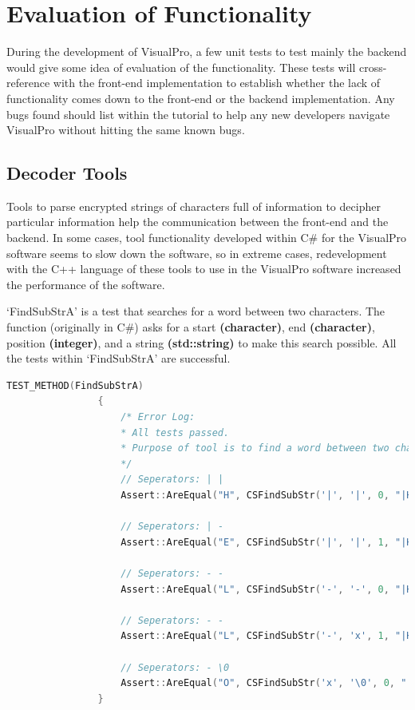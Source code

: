 \documentclass[12pt]{report} %
\begin{document}
	\chapter{Evaluation of Functionality}
		During the development of VisualPro, a few unit tests to test mainly the backend would give some idea of evaluation of the functionality. These tests will cross-reference with the front-end implementation to establish whether the lack of functionality comes down to the front-end or the backend implementation. Any bugs found should list within the tutorial to help any new developers navigate VisualPro without hitting the same known bugs.

		\section{Decoder Tools}
			Tools to parse encrypted strings of characters full of information to decipher particular information help the communication between the front-end and the backend. In some cases, tool functionality developed within C\# for the VisualPro software seems to slow down the software, so in extreme cases, redevelopment with the C++ language of these tools to use in the VisualPro software increased the performance of the software.

			`FindSubStrA' is a test that searches for a word between two characters. The function (originally in C\#) asks for a start \textbf{(character)}, end \textbf{(character)}, position \textbf{(integer)}, and a string \textbf{(std::string)} to make this search possible. All the tests within `FindSubStrA' are successful.

			\begin{lstlisting}[language=c++]
				TEST_METHOD(FindSubStrA)
				{
					/* Error Log:
					* All tests passed.
					* Purpose of tool is to find a word between two characters.
					*/
					// Seperators: | |
					Assert::AreEqual("H", CSFindSubStr('|', '|', 0, "|H|E-L-LxO").c_str());

					// Seperators: | -
					Assert::AreEqual("E", CSFindSubStr('|', '|', 1, "|H|E|L-LxO").c_str());

					// Seperators: - -
					Assert::AreEqual("L", CSFindSubStr('-', '-', 0, "|H|E-L-LxO").c_str());

					// Seperators: - -
					Assert::AreEqual("L", CSFindSubStr('-', 'x', 1, "|H|E-L-LxO").c_str());

					// Seperators: - \0
					Assert::AreEqual("O", CSFindSubStr('x', '\0', 0, "|H|E-L-LxO").c_str());
				}
			\end{lstlisting}
\end{document}
